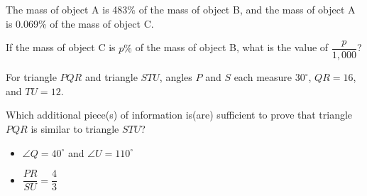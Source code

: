 The mass of object A is 483\% of the mass of object B, and the mass of object A is 0.069\% of the mass of object C.

If the mass of object C is \(p\%\) of the mass of object B, what is the value of \(\dfrac{p}{1,\!000}\)?

\vspace{0.75em}


\vspace{2em}
\newpage

\noindent\markforreview
\vspace{1em}

For triangle \(PQR\) and triangle \(STU\), angles \(P\) and \(S\) each measure \(30^\circ\), \(QR = 16\), and \(TU = 12\).

Which additional piece(s) of information is(are) sufficient to prove that triangle \(PQR\) is similar to triangle \(STU\)?

\begin{itemize}
\item[I] \(\angle Q = 40^\circ\) and \(\angle U = 110^\circ\)
\item[II] \(\dfrac{PR}{SU} = \dfrac{4}{3}\)
\end{itemize}

\vspace{0.75em}

